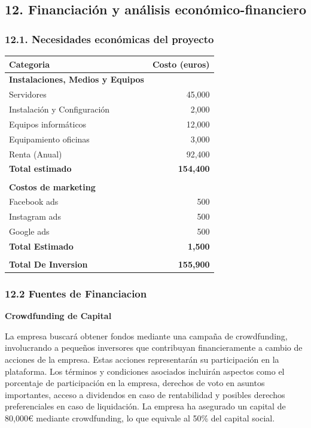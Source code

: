 \documentclass[
]{article}
\begin{document}
\newpage

\subsection{12. Financiación y análisis
económico-financiero}\label{financiaciuxf3n-y-anuxe1lisis-econuxf3mico-financiero}

\subsubsection{12.1. Necesidades económicas del
proyecto}\label{necesidades-econuxf3micas-del-proyecto}

\begin{longtable}[]{@{}lr@{}}
\toprule\noalign{}
Categoria & Costo (euros) \\
\midrule\noalign{}
\endhead
\bottomrule\noalign{}
\endlastfoot
\textbf{Instalaciones, Medios y Equipos} & \\
Servidores & 45,000 \\
Instalación y Configuración & 2,000 \\
Equipos informáticos & 12,000 \\
Equipamiento oficinas & 3,000 \\
Renta (Anual) & 92,400 \\
\textbf{Total estimado} & \textbf{154,400} \\
& \\
\textbf{Costos de marketing} & \\
Facebook ads & 500 \\
Instagram ads & 500 \\
Google ads & 500 \\
\textbf{Total Estimado} & \textbf{1,500} \\
& \\
\textbf{Total De Inversion} & \textbf{155,900} \\
\end{longtable}

\subsubsection{12.2 Fuentes de
Financiacion}\label{fuentes-de-financiacion}

\textbf{Crowdfunding de Capital}

La empresa buscará obtener fondos mediante una campaña de crowdfunding,
involucrando a pequeños inversores que contribuyan financieramente a
cambio de acciones de la empresa. Estas acciones representarán su
participación en la plataforma. Los términos y condiciones asociados
incluirán aspectos como el porcentaje de participación en la empresa,
derechos de voto en asuntos importantes, acceso a dividendos en caso de
rentabilidad y posibles derechos preferenciales en caso de liquidación.
La empresa ha asegurado un capital de 80,000€ mediante crowdfunding, lo
que equivale al 50\% del capital social.
\end{document}
